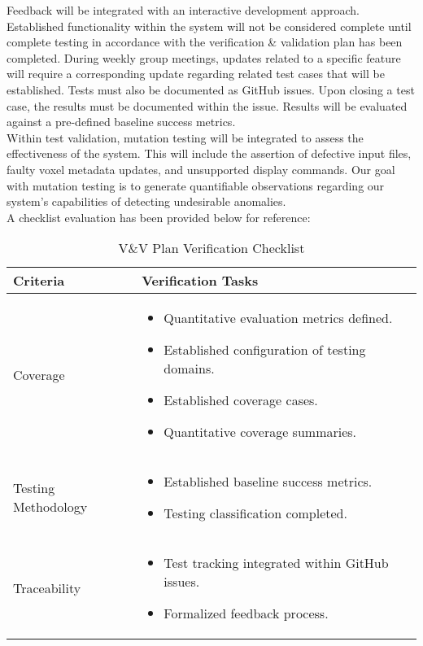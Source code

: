 \documentclass[12pt, titlepage]{article}
\begin{document}
\noindent Feedback will be integrated with an interactive development approach. Established functionality within the system will not be considered complete until complete testing in accordance with the verification \& validation plan has been completed. During weekly group meetings, updates related to a specific feature will require a corresponding update regarding related test cases that will be established. Tests must also be documented as GitHub issues. Upon closing a test case, the results must be documented within the issue. Results will be evaluated against a pre-defined baseline success metrics. \\

\noindent Within test validation, mutation testing will be integrated to assess the effectiveness of the system. This will include the assertion of defective input files, faulty voxel metadata updates, and unsupported display commands. Our goal with mutation testing is to generate quantifiable observations regarding our system’s capabilities of detecting undesirable anomalies.\\

\noindent A checklist evaluation has been provided below for reference:\\

\begin{table}[H]
\centering
\caption{V\&V Plan Verification Checklist}
\renewcommand{\arraystretch}{1.3}
\setlength{\tabcolsep}{8pt}
\begin{tabular}{|p{}|p{}|}
\hline
\textbf{Criteria} & \textbf{Verification Tasks} \\ \hline
Coverage &
\begin{itemize}
\item Quantitative evaluation metrics defined.
\item Established configuration of testing domains.
\item Established coverage cases.
\item Quantitative coverage summaries.
\end{itemize} \\ \hline
Testing Methodology &
\begin{itemize}
\item Established baseline success metrics.
\item Testing classification completed.
\end{itemize} \\ \hline
Traceability &
\begin{itemize}
\item Test tracking integrated within GitHub issues.
\item Formalized feedback process.
\end{itemize} \\ \hline
\end{tabular}
\end{table}
\end{document}
